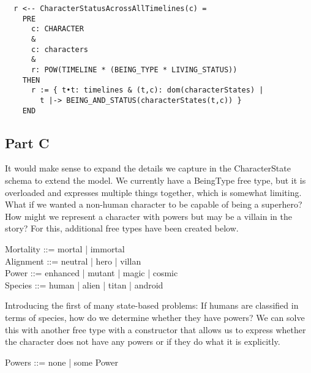 \documentclass{article}
\begin{document}
\pagebreak
\begin{verbatim}
  r <-- CharacterStatusAcrossAllTimelines(c) =
    PRE
      c: CHARACTER
      &
      c: characters
      &
      r: POW(TIMELINE * (BEING_TYPE * LIVING_STATUS))
    THEN
      r := { t•t: timelines & (t,c): dom(characterStates) | 
        t |-> BEING_AND_STATUS(characterStates(t,c)) }
    END
\end{verbatim}

\pagebreak

\subsection*{Part C}

It would make sense to expand the details we capture in the CharacterState schema to extend the model. We currently have a BeingType free type, but it is overloaded and expresses multiple things together, which is somewhat limiting. What if we wanted a non-human character to be capable of being a superhero? How might we represent a character with powers but may be a villain in the story? For this, additional free types have been created below. 
\begin{zed}
Mortality ::= mortal | immortal \\
Alignment ::= neutral | hero | villan \\
Power ::= enhanced | mutant | magic | cosmic \\
Species ::= human | alien | titan | android \\
\end{zed}

\hspace{-0.64cm} Introducing the first of many state-based problems: If humans are classified in terms of species, how do we determine whether they have powers? We can solve this with another free type with a constructor that allows us to express whether the character does not have any powers or if they do what it is explicitly. 
\begin{zed}
Powers ::= none | some \ldata Power \rdata \\
\end{zed}
\end{document}
